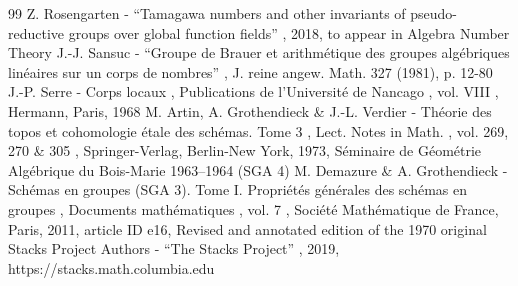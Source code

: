 \documentclass[10pt,a4paper]{amsart}
\theoremstyle{plain}
\theoremstyle{definition}
\begin{document}
\begin{thebibliography}{99}
 Z. Rosengarten - “Tamagawa numbers and other invariants of pseudo-reductive groups over global function fields” , 2018, to appear in Algebra Number Theory
 J.-J. Sansuc - “Groupe de Brauer et arithmétique des groupes algébriques linéaires sur un corps de nombres” , J. reine angew. Math. 327 (1981), p. 12-80
 J.-P. Serre - Corps locaux , Publications de l’Université de Nancago , vol. VIII , Hermann, Paris, 1968
 M. Artin, A. Grothendieck \& J.-L. Verdier - Théorie des topos et cohomologie étale des schémas. Tome 3 , Lect. Notes in Math. , vol. 269, 270 \& 305 , Springer-Verlag, Berlin-New York, 1973, Séminaire de Géométrie Algébrique du Bois-Marie 1963–1964 (SGA 4)
 M. Demazure \& A. Grothendieck - Schémas en groupes (SGA 3). Tome I. Propriétés générales des schémas en groupes , Documents mathématiques , vol. 7 , Société Mathématique de France, Paris, 2011, article ID e16, Revised and annotated edition of the 1970 original
 Stacks Project Authors - “The Stacks Project” , 2019, https://stacks.math.columbia.edu
\end{thebibliography}
\end{document}
